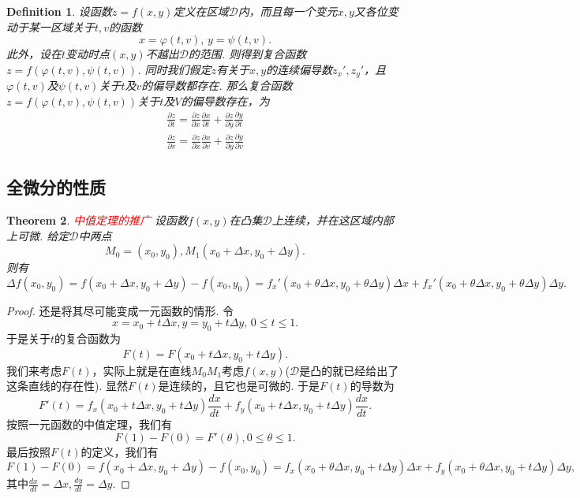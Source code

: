 \documentclass{article}
\newtheorem{theorem}{Theorem}[section]
\newtheorem{definition}[theorem]{Definition}
\newcommand{\redt}[1]{\textcolor{red}{#1}}
\begin{document}
\begin{definition}
\rm 设函数$z = f(x,y)$定义在区域$\mathcal{D}$内，而且每一个变元$x,y$又各位变动于某一区域关于$t,v$的函数
$$
x = \varphi(t,v),\, y = \psi(t,v).
$$
此外，设在$t$变动时点$(x,y)$不越出$\mathcal{D}$的范围. 则得到复合函数$z=f(\varphi(t,v),\psi(t,v))$. 同时我们假定$z$有关于$x,y$的连续偏导数$z_x',z_y'$，且$\varphi(t,v)$及$\psi(t,v)$关于$t$及$v$的偏导数都存在. 那么复合函数$z=f(\varphi(t,v),\psi(t,v))$关于$t$及$V$的偏导数存在，为
$$
\begin{array}{ll}
\frac{\partial z}{\partial t} = \frac{\partial z}{\partial x}\frac{\partial x}{\partial t} + \frac{\partial z}{\partial y}\frac{\partial y}{\partial t} \\
\frac{\partial z}{\partial v} = \frac{\partial z}{\partial x}\frac{\partial x}{\partial v} + \frac{\partial z}{\partial y}\frac{\partial y}{\partial v}
\end{array}
$$
\end{definition}

\subsection{全微分的性质}

\begin{theorem}
\rm \redt{中值定理的推广} 设函数$f(x,y)$在凸集$\mathcal{D}$上连续，并在这区域内部上可微. 给定$\mathcal{D}$中两点
$$
M_0 = (x_0,y_0), M_1(x_0+\Delta x,y_0 + \Delta y).
$$
则有
$$
\Delta f(x_0,y_0) = f(x_0+\Delta x, y_0 + \Delta y) - f(x_0,y_0) = f_x'(x_0+\theta\Delta x, y_0 + \theta\Delta y)\Delta x + f_x'(x_0+\theta\Delta x, y_0 + \theta\Delta y)\Delta y.
$$
\end{theorem}

\begin{proof}
还是将其尽可能变成一元函数的情形. 令
$$
x = x_0 + t\Delta x, y = y_0 + t\Delta y ,\, 0 \leq t \leq 1 .
$$
于是关于$t$的复合函数为
$$
F(t) = F(x_0 + t\Delta x,y_0 + t\Delta y).
$$
我们来考虑$F(t)$，实际上就是在直线$M_0M_1$考虑$f(x,y)$($\mathcal{D}$是凸的就已经给出了这条直线的存在性). 显然$F(t)$是连续的，且它也是可微的. 于是$F(t)$的导数为
$$
F'(t) = f_x(x_0 + t\Delta x,y_0 + t\Delta y)\frac{dx}{dt} + f_y(x_0 + t\Delta x,y_0 + t\Delta y)\frac{dx}{dt}. 
$$
按照一元函数的中值定理，我们有
$$
F(1)-F(0) = F'(\theta), 0 \leq \theta \leq 1.
$$
最后按照$F(t)$的定义，我们有
$$
F(1)-F(0) = f(x_0+\Delta x, y_0 + \Delta y) - f(x_0,y_0) = f_x(x_0 + \theta\Delta x,y_0 + t\Delta y)\Delta x + f_y(x_0 + \theta\Delta x,y_0 + t\Delta y)\Delta y,
$$
其中$\frac{dx}{dt} = \Delta x, \frac{dy}{dt} = \Delta y$. 
\end{proof}
\end{document}
